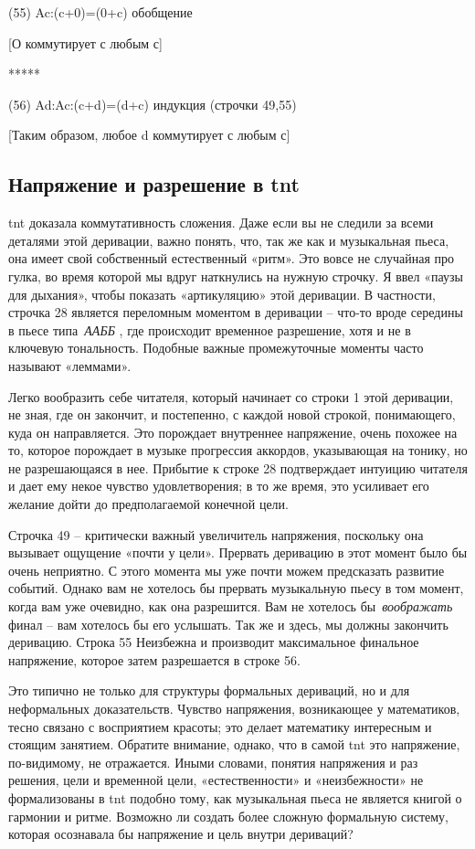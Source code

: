 \documentclass[../main.tex]{subfiles}
\begin{document}
(55) Ac:(c+0)=(0+c) обобщение

{[}О коммутирует с любым с{]}

*****

(56) Ad:Ac:(c+d)=(d+c) индукция (строчки 49,55)

{[}Таким образом, любое d коммутирует с любым с{]}


\subsection{Напряжение и разрешение в \acs{tnt}}

\acs{tnt} доказала коммутативность сложения. Даже если вы не следили за всеми деталями этой деривации, важно понять, что, так же как и музыкальная пьеса, она имеет свой собственный естественный «ритм». Это вовсе не случайная про гулка, во время которой мы вдруг наткнулись на нужную строчку. Я ввел «паузы для дыхания», чтобы показать «артикуляцию» этой деривации. В частности, строчка 28 является переломным моментом в деривации \--- что-то вроде середины в пьесе типа~\emph{ААББ} , где происходит временное разрешение, хотя и не в ключевую тональность. Подобные важные промежуточные моменты часто называют «леммами».

Легко вообразить себе читателя, который начинает со строки 1 этой деривации, не зная, где он закончит, и постепенно, с каждой новой строкой, понимающего, куда он направляется. Это порождает внутреннее напряжение, очень похожее на то, которое порождает в музыке прогрессия аккордов, указывающая на тонику, но не разрешающаяся в нее. Прибытие к строке 28 подтверждает интуицию читателя и дает ему некое чувство удовлетворения; в то же время, это усиливает его желание дойти до предполагаемой конечной цели.

Строчка 49 \--- критически важный увеличитель напряжения, поскольку она вызывает ощущение «почти у цели». Прервать деривацию в этот момент было бы очень неприятно. С этого момента мы уже почти можем предсказать развитие событий. Однако вам не хотелось бы прервать музыкальную пьесу в том момент, когда вам уже очевидно, как она разрешится. Вам не хотелось бы~\emph{воображать~} финал \--- вам хотелось бы его услышать. Так же и здесь, мы должны закончить деривацию. Строка 55 Неизбежна и производит максимальное финальное напряжение, которое затем разрешается в строке 56.

Это типично не только для структуры формальных дериваций, но и для неформальных доказательств. Чувство напряжения, возникающее у математиков, тесно связано с восприятием красоты; это делает математику интересным и стоящим занятием. Обратите внимание, однако, что в самой \acs{tnt} это напряжение, по-видимому, не отражается. Иными словами, понятия напряжения и раз решения, цели и временной цели, «естественности» и «неизбежности» не формализованы в \acs{tnt} подобно тому, как музыкальная пьеса не является книгой о гармонии и ритме. Возможно ли создать более сложную формальную систему, которая осознавала бы напряжение и цель внутри дериваций?
\end{document}
